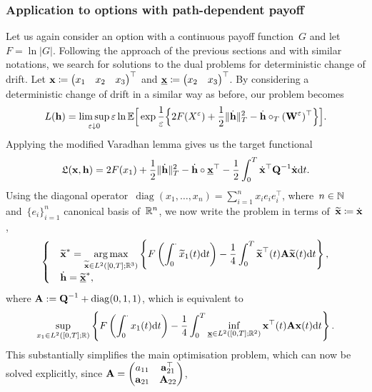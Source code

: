 \subsubsection{\textbf{Application to options with path-dependent payoff}}
Let us again consider an option with a continuous payoff function~$G$ and let~${F=\ln|G|}$. Following the approach of the previous sections and with similar notations, we search for solutions to the dual problems for deterministic change of drift.
Let 
$\boldsymbol{\mathrm{x}} \coloneqq \begin{pmatrix}x_1& x_2& x_3\end{pmatrix}^\top$ and 
$\underline{\boldsymbol{\mathrm{x}}}\coloneqq \begin{pmatrix}x_2 &  x_3\end{pmatrix}^\top$. 
By considering a deterministic change of drift in a similar way as before, our problem becomes 
\[
L(\boldsymbol{\mathrm{h}}) = \limsup\limits_{\varepsilon \downarrow 0} \varepsilon\ln\mathbb{E}\Big[\exp\frac{1}{\varepsilon}\Big\{
2F(X^\varepsilon) +\frac{1}{2}\|\dot{\boldsymbol{\mathrm{h}}}\|^2_T - \dot{\boldsymbol{\mathrm{h}}}\circ_{T}({\boldsymbol{\mathrm{W}}^\varepsilon})^\top\Big\}\Big].
\]
Applying the modified Varadhan lemma gives us the 
target functional
$$
\mathfrak{L}(\boldsymbol{\mathrm{x}},\boldsymbol{\mathrm{h}}) = 2F(x_1) + \frac{1}{2}\|\dot{\boldsymbol{\mathrm{h}}}\|^2_T - \dot{\boldsymbol{\mathrm{h}}}\circ\underline{\boldsymbol{\mathrm{x}}}^\top - \frac{1}{2}\int_0^T\dot{\boldsymbol{\mathrm{x}}}^\top \boldsymbol{\mathrm{Q}}^{-1} \dot{\boldsymbol{\mathrm{x}}} \mathrm{d} t.
$$
Using the diagonal operator~$\operatorname{diag}(x_1,\dots,x_n)=\sum_{i=1}^n x_i e_i e_i^\top$, where~$n\in\mathbb{N}$ and~$\{e_i\}_{i=1}^n$ canonical basis of~$\mathbb{R}^n$, we now write the problem in terms of~$\widetilde{\boldsymbol{\mathrm{x}}}\coloneqq\dot{\boldsymbol{\mathrm{x}}}\,$,
$$
\begin{cases}
& \displaystyle \widetilde{\boldsymbol{\mathrm{x}}}^{*}  =  \operatorname*{arg\,max}\limits_{\widetilde{\boldsymbol{\mathrm{x}}} \in L^2([0,T]; \mathbb{R}^3)}
\left\{F\left(\int_0^\cdot \widetilde x_1(t) \mathrm{d} t\right) - \frac{1}{4}\int_0^T \widetilde{\boldsymbol{\mathrm{x}}}^\top(t) 
\boldsymbol{\mathrm{A}}\widetilde{\boldsymbol{\mathrm{x}}}(t) \mathrm{d} t\right\}, \\
& \displaystyle \dot{\boldsymbol{\mathrm{h}}} = \widetilde{\underline{\boldsymbol{\mathrm{x}}}}^{*},
\end{cases}
$$
where 
$\boldsymbol{\mathrm{A}} := \boldsymbol{\mathrm{Q}}^{-1} + \operatorname{diag}(0,1,1)$, 
which is equivalent to
\begin{equation}\label{eq:SupInfInt}
\sup\limits_{x_1\in L^2([0,T]; \mathbb{R})}\left \{F\left(\int_0^\cdot x_1(t) \mathrm{d} t\right) - \frac{1}{4}\int_0^T \inf_{\underline{\boldsymbol{\mathrm{x}}}\in L^2([0,T]; \mathbb{R}^2)} \boldsymbol{\mathrm{x}}^\top(t) \boldsymbol{\mathrm{A}}\boldsymbol{\mathrm{x}}(t) \mathrm{d} t \right \}.
\end{equation}
This substantially simplifies the main optimisation problem, which can now be solved explicitly, since 
$
\boldsymbol{\mathrm{A}} =
\begin{pmatrix}
a_{11} & \boldsymbol{\mathrm{a}}_{21}^\top\\
\boldsymbol{\mathrm{a}}_{21} &\boldsymbol{\mathrm{A}}_{22}\\
\end{pmatrix}$,
